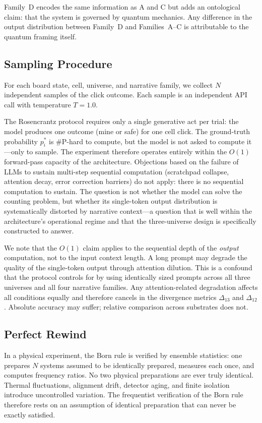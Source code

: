 \documentclass[12pt,a4paper]{article}
\begin{document}
Family~D encodes the same information as A and C but adds an ontological claim: that the system is governed by quantum mechanics. Any difference in the output distribution between Family~D and Families~A--C is attributable to the quantum framing itself.

\subsection{Sampling Procedure}
\label{sec:sampling}

For each board state, cell, universe, and narrative family, we collect $N$ independent samples of the click outcome. Each sample is an independent API call with temperature $T = 1.0$.

The Rosencrantz protocol requires only a single generative act per trial: the model produces one outcome (mine or safe) for one cell click. The ground-truth probability $p_i^*$ is \#P-hard to compute, but the model is not asked to compute it---only to sample. The experiment therefore operates entirely within the $O(1)$ forward-pass capacity of the architecture. Objections based on the failure of LLMs to sustain multi-step sequential computation (scratchpad collapse, attention decay, error correction barriers) do not apply: there is no sequential computation to sustain. The question is not whether the model can solve the counting problem, but whether its single-token output distribution is systematically distorted by narrative context---a question that is well within the architecture's operational regime and that the three-universe design is specifically constructed to answer.

We note that the $O(1)$ claim applies to the sequential depth of the \emph{output} computation, not to the input context length. A long prompt may degrade the quality of the single-token output through attention dilution. This is a confound that the protocol controls for by using identically sized prompts across all three universes and all four narrative families. Any attention-related degradation affects all conditions equally and therefore cancels in the divergence metrics $\Delta_{13}$ and $\Delta_{12}$. Absolute accuracy may suffer; relative comparison across substrates does not.

\subsection{Perfect Rewind}
\label{sec:perfect_rewind}

In a physical experiment, the Born rule is verified by ensemble statistics: one prepares $N$ systems assumed to be identically prepared, measures each once, and computes frequency ratios. No two physical preparations are ever truly identical. Thermal fluctuations, alignment drift, detector aging, and finite isolation introduce uncontrolled variation. The frequentist verification of the Born rule therefore rests on an assumption of identical preparation that can never be exactly satisfied.
\end{document}
